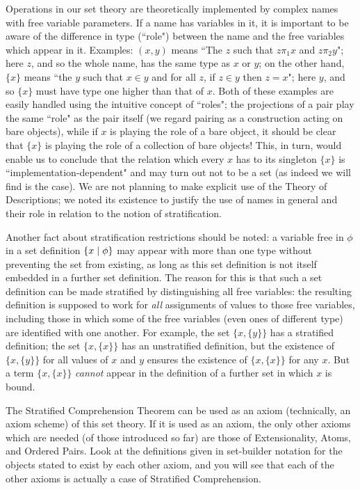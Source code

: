 Operations in our set theory are theoretically implemented by complex
names with free variable parameters.  If a name has variables in it,
it is important to be aware of the difference in type (``role")
between the name and the free variables which appear in it.  Examples:
$(x,y)$ means ``The $z$ such that $z
\mathrel{\pi_1} x$ and $z \mathrel{\pi_2} y$"; here $z$, and so the whole name,
has the same type as $x$ or $y$; on the other hand, $\{x\}$ means ``the $y$
such that $x
\in y$ and for all $z$, if $z \in y$ then $z = x$"; here $y$, and so
$\{x\}$ must have type one higher than that of $x$.
Both of these examples are easily handled using the intuitive concept of
``roles"; 
the projections of a pair play the same ``role" as the pair itself (we regard pairing as a
construction acting on bare objects), while if $x$ is playing the role of a
bare object, it should be clear that $\{x\}$ is playing the role of a
collection of bare objects!  This, in turn, would enable us to conclude that
the relation which every $x$ has to its singleton $\{x\}$ is
``implementation-dependent" and may turn out not to be a set (as indeed we will find is the case).  We are not planning to make
explicit use of the Theory of Descriptions; we noted its existence to
justify the use of names in general and their role in relation to the
notion of stratification.

Another fact about stratification restrictions should be noted: a
variable free in $\phi$ in a set definition $\{x \mid \phi\}$ may
appear with more than one type without preventing the set from
existing, as long as this set definition is not itself embedded in a
further set definition.  The reason for this is that such a set
definition can be made stratified by distinguishing all free
variables: the resulting definition is supposed to work for {\itshape
all\/} assignments of values to those free variables, including those
in which some of the free variables (even ones of different type) are
identified with one another.  For example, the set $\{x,\{y\}\}$ has a
stratified definition; the set $\{x,\{x\}\}$ has an unstratified
definition, but the existence of $\{x,\{y\}\}$ for all values of $x$
and $y$ ensures the existence of $\{x,\{x\}\}$ for any $x$.  But a
term $\{x,\{x\}\}$ {\itshape cannot\/} appear in the definition of a
further set in which $x$ is bound.

The Stratified Comprehension Theorem
can be used as an axiom (technically, an axiom scheme) of this set theory.  If
it is used as an axiom, the only other axioms which are needed (of those
introduced so far) are those of Extensionality,
Atoms, and Ordered Pairs.  Look
at the definitions given in set-builder notation for the objects
stated to exist by each other axiom, and you will see that each of the
other axioms is actually a case of Stratified Comprehension.

